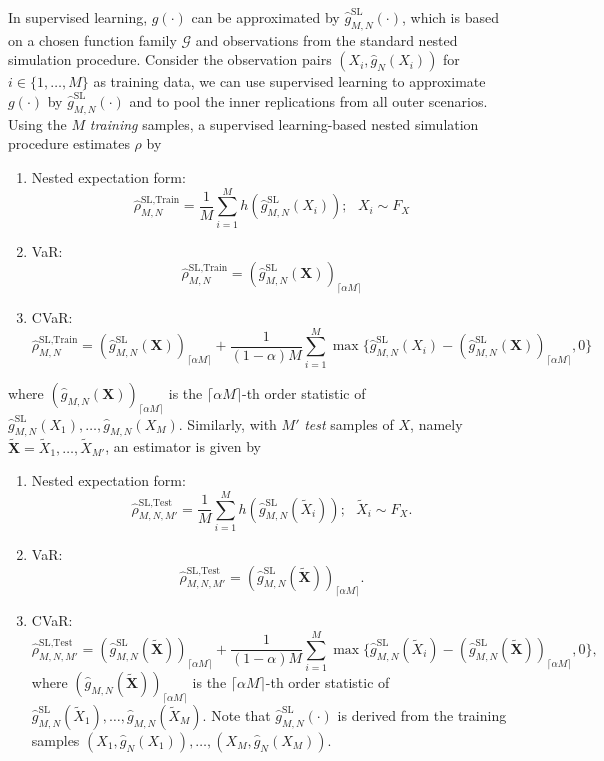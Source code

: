 In supervised learning, $g(\cdot)$ can be approximated by $\hat{g}^{\text{SL}}_{M, N}(\cdot)$, which is based on a chosen function family $\mathcal{G}$ and observations from the standard nested simulation procedure.
Consider the observation pairs $(X_i, \hat{g}_N(X_i))$ for $i \in \{1, \dots, M\}$ as training data, we can use supervised learning to approximate $g(\cdot)$ by $\hat{g}^{\text{SL}}_{M, N}(\cdot)$ and to pool the inner replications from all outer scenarios.
Using the $M$ \textit{training} samples, a supervised learning-based nested simulation procedure estimates  $\rho$ by

\begin{enumerate}
    \item   Nested expectation form:
            $$\hat{\rho}^{\text{SL}, \text{Train}}_{M, N} = \frac{1}{M} \sum_{i=1}^M h(\hat{g}^{\text{SL}}_{M, N}(X_i)); ~~~ X_i \sim F_X$$
    \item   VaR:
            $$\hat{\rho}^{\text{SL}, \text{Train}}_{M, N} = (\hat{g}^{\text{SL}}_{M, N}(\mathbf{X}))_{\lceil \alpha M \rceil}$$
    \item   CVaR:
            $$\hat{\rho}^{\text{SL}, \text{Train}}_{M, N} = (\hat{g}^{\text{SL}}_{M, N}(\mathbf{X}))_{\lceil \alpha M \rceil} + \frac{1}{(1-\alpha) M} \sum_{i=1}^M \max \{\hat{g}^{\text{SL}}_{M, N}(X_i) - (\hat{g}^{\text{SL}}_{M, N}(\mathbf{X}))_{\lceil \alpha M \rceil}, 0 \}$$
\end{enumerate}
where $(\hat{g}_{M, N}(\mathbf{X}))_{\lceil \alpha M \rceil}$ is the $\lceil \alpha M \rceil$-th order statistic of $\hat{g}^{\text{SL}}_{M, N}(X_1), \dots, \hat{g}_{M, N}(X_M)$.
Similarly, with $M'$ \textit{test} samples of $X$, namely $\tilde{\mathbf{X}} = \tilde{X}_1, \dots, \tilde{X}_{M'}$, an estimator is given by

\begin{enumerate}
    \item   Nested expectation form:
            $$\hat{\rho}^{\text{SL}, \text{Test}}_{M, N, M'} = \frac{1}{M} \sum_{i=1}^M h(\hat{g}^{\text{SL}}_{M, N}(\tilde{X}_i)); ~~~ \tilde{X}_i \sim F_X.$$
    \item   VaR:
            $$\hat{\rho}^{\text{SL}, \text{Test}}_{M, N, M'} = (\hat{g}^{\text{SL}}_{M, N}(\tilde{\mathbf{X}}))_{\lceil \alpha M \rceil}.$$
    \item   CVaR:
            $$\hat{\rho}^{\text{SL}, \text{Test}}_{M, N, M'} = (\hat{g}^{\text{SL}}_{M, N}(\tilde{\mathbf{X}}))_{\lceil \alpha M \rceil} + \frac{1}{(1-\alpha) M} \sum_{i=1}^M \max \{\hat{g}^{\text{SL}}_{M, N}(\tilde{X}_i) - (\hat{g}^{\text{SL}}_{M, N}(\tilde{\mathbf{X}}))_{\lceil \alpha M \rceil}, 0 \}, $$
            where $(\hat{g}_{M, N}(\tilde{\mathbf{X}}))_{\lceil \alpha M \rceil}$ is the $\lceil \alpha M \rceil$-th order statistic of $\hat{g}^{\text{SL}}_{M, N}(\tilde{X}_1), \dots, \hat{g}_{M, N}(\tilde{X}_M)$. 
            Note that $\hat{g}^{\text{SL}}_{M, N}(\cdot)$ is derived from the training samples $(X_1, \hat{g}_N(X_1)), \dots, (X_M, \hat{g}_N(X_M))$.
\end{enumerate}

